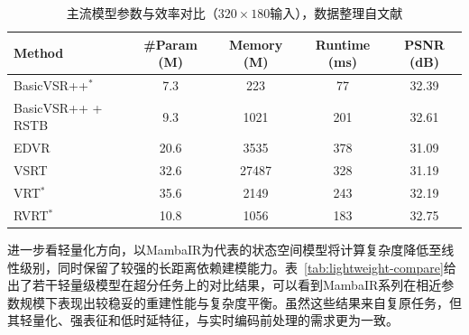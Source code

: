 \begin{table}[htbp]
  \centering
  \caption{主流模型参数与效率对比（$320 \times 180$输入），数据整理自文献\cite{ref23-liang2022rvrt}}
  \label{tab:model-param-compare}
  \begin{tabular}{lcccc}
    \toprule
    \textbf{Method} & \textbf{\#Param (M)} & \textbf{Memory (M)} & \textbf{Runtime (ms)} & \textbf{PSNR (dB)} \\
    \midrule
    BasicVSR++$^{\ast}$       & 7.3  & 223   & 77  & 32.39 \\
    BasicVSR++ + RSTB & 9.3  & 1021  & 201 & 32.61 \\
    EDVR             & 20.6 & 3535  & 378 & 31.09 \\
    VSRT             & 32.6 & 27487 & 328 & 31.19 \\
    VRT$^{\ast}$              & 35.6 & 2149  & 243 & 32.19 \\
    RVRT$^{\ast}$             & 10.8 & 1056  & 183 & 32.75 \\
    \bottomrule
  \end{tabular}
\end{table}

进一步看轻量化方向，以MambaIR\cite{ref21-guo2024mambaIRv2}为代表的状态空间模型将计算复杂度降低至线性级别，同时保留了较强的长距离依赖建模能力。表~\ref{tab:lightweight-compare}给出了若干轻量级模型在超分任务上的对比结果，可以看到MambaIR系列在相近参数规模下表现出较稳妥的重建性能与复杂度平衡。虽然这些结果来自复原任务，但其轻量化、强表征和低时延特征，与实时编码前处理的需求更为一致。

